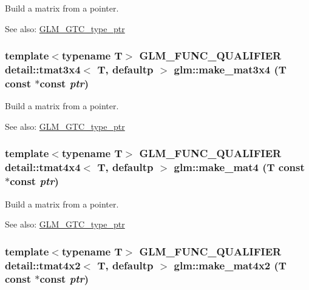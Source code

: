 Build a matrix from a pointer. \begin{Desc}
\item[See also:]\hyperlink{group__gtc__type__ptr}{GLM\_\-GTC\_\-type\_\-ptr} \end{Desc}
\hypertarget{group__gtc__type__ptr_g81d4d38acbaded29fb07ca282f089122}{
\subsubsection[make\_\-mat3x4]{\setlength{\rightskip}{0pt plus 5cm}template$<$typename T$>$ GLM\_\-FUNC\_\-QUALIFIER detail::tmat3x4$<$ T, defaultp $>$ glm::make\_\-mat3x4 (T const $\ast$const  {\em ptr})}}
\label{group__gtc__type__ptr_g81d4d38acbaded29fb07ca282f089122}


Build a matrix from a pointer. \begin{Desc}
\item[See also:]\hyperlink{group__gtc__type__ptr}{GLM\_\-GTC\_\-type\_\-ptr} \end{Desc}
\hypertarget{group__gtc__type__ptr_g082261bc3bf4a6d320d6beaebcbaf1db}{
\subsubsection[make\_\-mat4]{\setlength{\rightskip}{0pt plus 5cm}template$<$typename T$>$ GLM\_\-FUNC\_\-QUALIFIER detail::tmat4x4$<$ T, defaultp $>$ glm::make\_\-mat4 (T const $\ast$const  {\em ptr})}}
\label{group__gtc__type__ptr_g082261bc3bf4a6d320d6beaebcbaf1db}


Build a matrix from a pointer. \begin{Desc}
\item[See also:]\hyperlink{group__gtc__type__ptr}{GLM\_\-GTC\_\-type\_\-ptr} \end{Desc}
\hypertarget{group__gtc__type__ptr_gc253e8157af1e4ec366c80d4bd90cbb2}{
\subsubsection[make\_\-mat4x2]{\setlength{\rightskip}{0pt plus 5cm}template$<$typename T$>$ GLM\_\-FUNC\_\-QUALIFIER detail::tmat4x2$<$ T, defaultp $>$ glm::make\_\-mat4x2 (T const $\ast$const  {\em ptr})}}
\label{group__gtc__type__ptr_gc253e8157af1e4ec366c80d4bd90cbb2}


